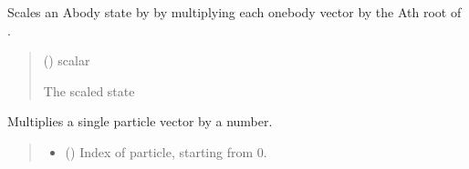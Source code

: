 \documentclass[letterpaper,10pt,english]{sphinxmanual}
\begin{document}
\begin{fulllineitems}
\begin{fulllineitems}
\label{\detokenize{spinbox:spinbox.core.ProductState.scale_all}}
\pysigstartsignatures
{}
\pysigstopsignatures
\sphinxAtStartPar
Scales an A\sphinxhyphen{}body state by  by multiplying each one\sphinxhyphen{}body vector by the Ath root of .
\begin{quote}\begin{description}
\sphinxAtStartPar
{} () \textendash{} scalar

\sphinxAtStartPar
The scaled state

\sphinxAtStartPar
{\hyperref[\detokenize{spinbox:spinbox.core.ProductState}]{}}

\end{description}\end{quote}

\end{fulllineitems}


\begin{fulllineitems}
\label{\detokenize{spinbox:spinbox.core.ProductState.scale_one}}
\pysigstartsignatures
{}
\pysigstopsignatures
\sphinxAtStartPar
Multiplies a single particle vector by a number.
\begin{quote}\begin{description}
\begin{itemize}
\item {} 
\sphinxAtStartPar
{} () \textendash{} Index of particle, starting from 0.


\end{itemize}
\end{description}
\end{quote}
\end{fulllineitems}
\end{fulllineitems}
\end{document}

